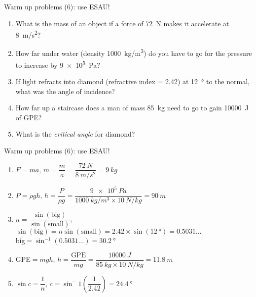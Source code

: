 \documentclass[14pt]{beamer}
\begin{document}
\begin{frame}{Warm up problems (6): use ESAU!}
\vspace*{-0.8em}\begin{enumerate}
\item\label{2.2} What is the mass of an object if a force of \SI{72}{N} makes it accelerate at \SI{8}{m/s^{2}}?
\item\label{18.3} How far under water (density \SI{1000}{kg/m^3}) do you have to go for the pressure to increase by \SI{9e5}{Pa}?
\item\label{15.2} If light refracts into diamond (refractive index = 2.42) at \SI{12}{\degree} to the normal, what was the angle of incidence?
\item\label{7.3} How far up a staircase does a man of mass \SI{85}{kg} need to go to gain \SI{10000}{J} of GPE?
\item\label{16.3} What is the \emph{critical angle} for diamond?
\end{enumerate}
\end{frame}

\begin{frame}{Warm up problems (6): use ESAU!}
\vspace*{-0.8em}\begin{enumerate}
\item\label{2.2} $F=ma$, $m=\dfrac{m}{a}=\dfrac{\SI{72}{N}}{\SI{8}{m/s^2}}=\SI{9}{kg}$
\item\label{18.3} $P=\rho gh$, $h=\dfrac{P}{\rho g}=\dfrac{\SI{9e5}{Pa}}{\SI{1000}{kg/m^3}\times\SI{10}{N/kg}}=\SI{90}{m}$
\item\label{15.2} $n=\dfrac{\sin(\text{big})}{\sin(\text{small})}$, $\sin(\text{big})=n \sin(\text{small})=2.42\times\sin(\SI{12}{\degree})=0.5031\ldots$\\
big$=\sin^{-1}(0.5031\ldots)=\SI{30.2}{\degree}$
\item\label{7.3} GPE$=mgh$, $h=\dfrac{\text{GPE}}{mg}=\dfrac{\SI{10000}{J}}{\SI{85}{kg}\times\SI{10}{N/kg}}=\SI{11.8}{m}$
\item\label{16.3} $\sin c = \dfrac{1}{n}$, $c=\sin^-1\left(\dfrac{1}{2.42}\right)=\SI{24.4}{\degree}$
\end{enumerate}
\end{frame}
\end{document}
